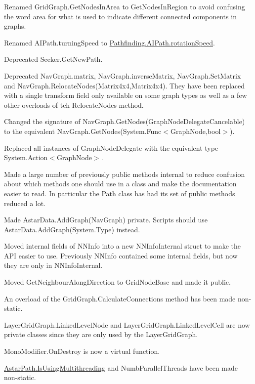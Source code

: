 \begin{DoxyItemize}
\begin{DoxyItemize}
\begin{DoxyItemize}
\item Renamed Grid\+Graph.\+Get\+Nodes\+In\+Area to Get\+Nodes\+In\+Region to avoid confusing the word \textquotesingle{}area\textquotesingle{} for what is used to indicate different connected components in graphs.
\item Renamed A\+I\+Path.\+turning\+Speed to \mbox{\hyperlink{class_pathfinding_1_1_a_i_path_a7b098446f4a5661897899513e20b233e}{Pathfinding.\+A\+I\+Path.\+rotation\+Speed}}.
\item Deprecated Seeker.\+Get\+New\+Path.
\item Deprecated Nav\+Graph.\+matrix, Nav\+Graph.\+inverse\+Matrix, Nav\+Graph.\+Set\+Matrix and Nav\+Graph.\+Relocate\+Nodes(\+Matrix4x4,\+Matrix4x4). They have been replaced with a single transform field only available on some graph types as well as a few other overloads of teh Relocate\+Nodes method.
\item Changed the signature of Nav\+Graph.\+Get\+Nodes(\+Graph\+Node\+Delegate\+Cancelable) to the equivalent Nav\+Graph.\+Get\+Nodes(System.\+Func$<$\+Graph\+Node,bool$>$).
\item Replaced all instances of Graph\+Node\+Delegate with the equivalent type System.\+Action$<$\+Graph\+Node$>$.
\item Made a large number of previously public methods internal to reduce confusion about which methods one should use in a class and make the documentation easier to read. In particular the Path class has had its set of public methods reduced a lot.
\item Made Astar\+Data.\+Add\+Graph(\+Nav\+Graph) private. Scripts should use Astar\+Data.\+Add\+Graph(System.\+Type) instead.
\item Moved internal fields of N\+N\+Info into a new N\+N\+Info\+Internal struct to make the A\+PI easier to use. Previously N\+N\+Info contained some internal fields, but now they are only in N\+N\+Info\+Internal.
\item Moved Get\+Neighbour\+Along\+Direction to Grid\+Node\+Base and made it public.
\item An overload of the Grid\+Graph.\+Calculate\+Connections method has been made non-\/static.
\item Layer\+Grid\+Graph.\+Linked\+Level\+Node and Layer\+Grid\+Graph.\+Linked\+Level\+Cell are now private classes since they are only used by the Layer\+Grid\+Graph.
\item Mono\+Modifier.\+On\+Destroy is now a virtual function.
\item \mbox{\hyperlink{class_astar_path_ad713824531804d3622b2a156b0f1c2ea}{Astar\+Path.\+Is\+Using\+Multithreading}} and Numb\+Parallel\+Threads have been made non-\/static.

\end{DoxyItemize}
\end{DoxyItemize}
\end{DoxyItemize}
